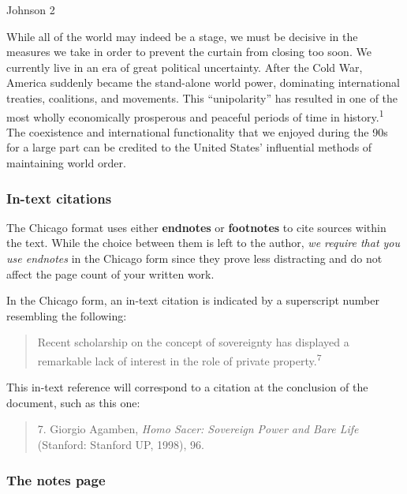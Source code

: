 \documentclass[12pt, hidelinks]{article} %
\newcommand{\tab}{\hspace*{2em}}
\begin{document}


\thispagestyle{empty}
\begin{flushright}Johnson 2\end{flushright}
\bigskip
\begin{doublespace}

\tab While all of the world may indeed be a stage, we must be decisive in the measures we take in order to prevent the curtain from closing too soon. We currently live in an era of great political uncertainty. After the Cold War, America suddenly became the stand-alone world power, dominating international treaties, coalitions, and movements. This ``unipolarity'' has resulted in one of the most wholly economically prosperous and peaceful periods of time in history.\textsuperscript{1} The coexistence and international functionality that we enjoyed during the 90s for a large part can be credited to the United States' influential methods of maintaining world order.
\end{doublespace}
\newpage



\subsubsection {In-text citations}
The Chicago format uses either \textbf{endnotes} or \textbf{footnotes} to cite sources within the text. While the choice between them is left to the author, \emph{we require that you use endnotes} in the Chicago form since they prove less distracting and do not affect the page count of your written work. 

In the Chicago form, an in-text citation is indicated by a superscript number resembling the following:

\begin{quote}
Recent scholarship on the concept of sovereignty has displayed a remarkable lack of interest in the role of private property.\textsuperscript{7}
\end{quote}
This in-text reference will correspond to a citation at the conclusion of the document, such as this one:

\begin{quote}
\tab 7. Giorgio Agamben, \emph{Homo Sacer: Sovereign Power and Bare Life} (Stanford: Stanford UP, 1998), 96.
\end{quote}


\subsubsection{The notes page}
\end{document}
